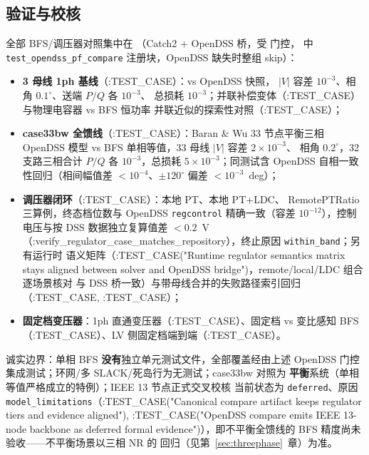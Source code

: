 \subsection{验证与校核}
全部 BFS/调压器对照集中在 
（Catch2 + OpenDSS 桥，受  门控，
 中 \texttt{test\_opendss\_pf\_compare}
注册块，OpenDSS 缺失时整组 skip）：
\begin{itemize}
  \item \textbf{3 母线 1ph 基线}（:TEST\_CASE）：vs OpenDSS 快照，
        $|V|$ 容差 $10^{-3}$、相角 $0.1^\circ$、送端 $P/Q$ 各 $10^{-3}$、
        总损耗 $10^{-3}$；并联补偿变体（:TEST\_CASE）与物理电容器 vs BFS 恒功率
        并联近似的探索性对照（:TEST\_CASE）；
  \item \textbf{case33bw 全馈线}（:TEST\_CASE）：Baran \& Wu 33 节点平衡三相
        OpenDSS 模型 vs BFS 单相等值，33 母线 $|V|$ 容差 $2\times10^{-3}$、
        相角 $0.2^\circ$，32 支路三相合计 $P/Q$ 各 $10^{-3}$，总损耗
        $5\times10^{-3}$；同测试含 OpenDSS 自相一致性回归（相间幅值差
        $<10^{-4}$、$\pm120^\circ$ 偏差 $<10^{-3}$~deg）；
  \item \textbf{调压器闭环}（:TEST\_CASE）：本地 PT、本地 PT+LDC、
        RemotePTRatio 三算例，终态档位数与 OpenDSS \texttt{regcontrol}
        精确一致（容差 $10^{-12}$），控制电压与按 DSS 数据独立复算值差
        $<0.2$~V（:verify\_regulator\_case\_matches\_repository），终止原因 \texttt{within\_band}；另有运行时
        语义矩阵（:TEST\_CASE("Runtime regulator semantics matrix stays aligned between solver and OpenDSS bridge")，remote/local/LDC 组合逐场景核对 
        与 DSS 桥一致）与带母线合并的失败路径索引回归（:TEST\_CASE, :TEST\_CASE）；
  \item \textbf{固定档变压器}：1ph 直通变压器（:TEST\_CASE）、固定档 vs 变比感知
        BFS（:TEST\_CASE）、LV 侧固定档端到端（:TEST\_CASE）。
\end{itemize}
诚实边界：单相 BFS \textbf{没有}独立单元测试文件，全部覆盖经由上述
OpenDSS 门控集成测试；环网/多 SLACK/死岛行为无测试；case33bw 对照为
\textbf{平衡}系统（单相等值严格成立的特例）；IEEE 13 节点正式交叉校核
当前状态为 \texttt{deferred}、原因 \texttt{model\_limitations}（:TEST\_CASE("Canonical compare artifact keeps regulator tiers and evidence aligned"),
:TEST\_CASE("OpenDSS compare emits IEEE 13-node backbone as deferred formal evidence")），即不平衡全馈线的 BFS 精度尚未验收——不平衡场景以三相 NR 的
回归（见第~\ref{sec:threephase}~章）为准。
